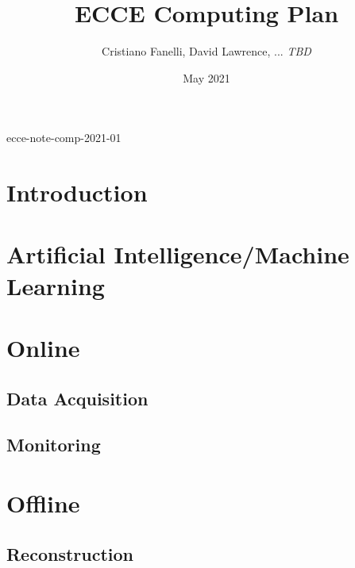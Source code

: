 \documentclass{article}
\title{ECCE Computing Plan}
\author{Cristiano Fanelli, David Lawrence, ... \emph{TBD}}
\date{May 2021}
\begin{document}
\maketitle

\vspace{-6cm}
\hspace*{0pt}\hfill ecce-note-comp-2021-01
\vspace{6cm}

\section{Introduction}

\cite{eic_yellow_report_v1_1}\cite{sphenix_computing_plan_2019}

\section{Artificial Intelligence/Machine Learning}

\section{Online}

\subsection{Data Acquisition}

\subsection{Monitoring}

\section{Offline}

\subsection{Reconstruction}
\end{document}
